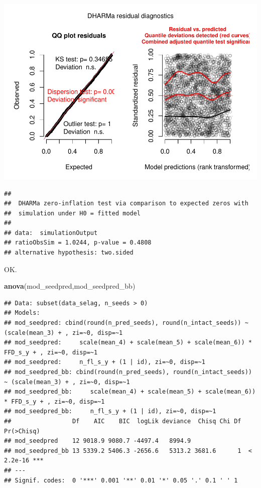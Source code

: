 \documentclass[
]{article}
\newenvironment{Shaded}{\begin{snugshade}}{\end{snugshade}}
\newcommand{\KeywordTok}[1]{\textcolor[rgb]{0.13,0.29,0.53}{\textbf{#1}}}
\newcommand{\NormalTok}[1]{#1}
\begin{document}
\includegraphics{lathyrus_ms3_3_after_rev_Ecology_files/figure-latex/unnamed-chunk-46-1.pdf}

\begin{verbatim}
## 
##  DHARMa zero-inflation test via comparison to expected zeros with
##  simulation under H0 = fitted model
## 
## data:  simulationOutput
## ratioObsSim = 1.0244, p-value = 0.4808
## alternative hypothesis: two.sided
\end{verbatim}

OK.

\begin{Shaded}
\begin{Highlighting}[]
\KeywordTok{anova}\NormalTok{(mod\_seedpred,mod\_seedpred\_bb)}
\end{Highlighting}
\end{Shaded}

\begin{verbatim}
## Data: subset(data_selag, n_seeds > 0)
## Models:
## mod_seedpred: cbind(round(n_pred_seeds), round(n_intact_seeds)) ~ (scale(mean_3) + , zi=~0, disp=~1
## mod_seedpred:     scale(mean_4) + scale(mean_5) + scale(mean_6)) * FFD_s_y + , zi=~0, disp=~1
## mod_seedpred:     n_fl_s_y + (1 | id), zi=~0, disp=~1
## mod_seedpred_bb: cbind(round(n_pred_seeds), round(n_intact_seeds)) ~ (scale(mean_3) + , zi=~0, disp=~1
## mod_seedpred_bb:     scale(mean_4) + scale(mean_5) + scale(mean_6)) * FFD_s_y + , zi=~0, disp=~1
## mod_seedpred_bb:     n_fl_s_y + (1 | id), zi=~0, disp=~1
##                 Df    AIC    BIC  logLik deviance  Chisq Chi Df Pr(>Chisq)    
## mod_seedpred    12 9018.9 9080.7 -4497.4   8994.9                             
## mod_seedpred_bb 13 5339.2 5406.3 -2656.6   5313.2 3681.6      1  < 2.2e-16 ***
## ---
## Signif. codes:  0 '***' 0.001 '**' 0.01 '*' 0.05 '.' 0.1 ' ' 1
\end{verbatim}
\end{document}
